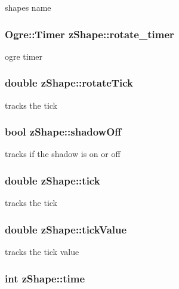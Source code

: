 shapes name \hypertarget{classz_shape_ac8cc62dd7693b1b06d49b837b9a95b6e}{
\subsubsection[{rotate\-\_\-timer}]{\setlength{\rightskip}{0pt plus 5cm}Ogre\-::\-Timer z\-Shape\-::rotate\-\_\-timer}}\label{classz_shape_ac8cc62dd7693b1b06d49b837b9a95b6e}
ogre timer \hypertarget{classz_shape_ababb157263bf9c66de983ac1e5ddec6d}{
\subsubsection[{rotate\-Tick}]{\setlength{\rightskip}{0pt plus 5cm}double z\-Shape\-::rotate\-Tick}}\label{classz_shape_ababb157263bf9c66de983ac1e5ddec6d}
tracks the tick \hypertarget{classz_shape_a893430248d4812e90d8deca062d39820}{
\subsubsection[{shadow\-Off}]{\setlength{\rightskip}{0pt plus 5cm}bool z\-Shape\-::shadow\-Off}}\label{classz_shape_a893430248d4812e90d8deca062d39820}
tracks if the shadow is on or off \hypertarget{classz_shape_add03bb3345a58059a1f76a4cfaaedb54}{
\subsubsection[{tick}]{\setlength{\rightskip}{0pt plus 5cm}double z\-Shape\-::tick}}\label{classz_shape_add03bb3345a58059a1f76a4cfaaedb54}
tracks the tick \hypertarget{classz_shape_af8baf4bfde98df012d1389768d9571b0}{
\subsubsection[{tick\-Value}]{\setlength{\rightskip}{0pt plus 5cm}double z\-Shape\-::tick\-Value}}\label{classz_shape_af8baf4bfde98df012d1389768d9571b0}
tracks the tick value \hypertarget{classz_shape_a772c76f69f30fefa4b8d08a9d1546dba}{
\subsubsection[{time}]{\setlength{\rightskip}{0pt plus 5cm}int z\-Shape\-::time}}\label{classz_shape_a772c76f69f30fefa4b8d08a9d1546dba}

